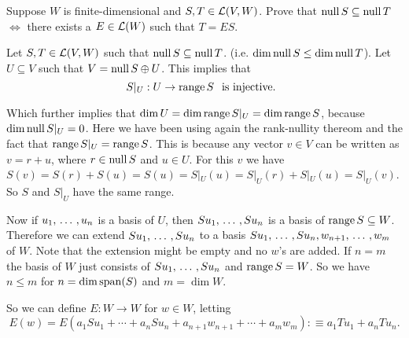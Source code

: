 %
%
%
%


\begin{xrcs}
  Suppose $W$ is finite-dimensional and $S, T \in \mathcal{L} (V,W)$. Prove that $\operatorname{null} S \subseteq \operatorname{null} T$ $\iff$ there exists a $E \in \mathcal{L} (W)$ such that $T=ES$.

  \begin{prf}
    \Rightarrowdirection Let $S, T \in \mathcal{L} (V,W)$ such that $\operatorname{null} S \subseteq \operatorname{null} T$. (i.e. $\dim \operatorname{null} S \leq \dim \operatorname{null} T$). Let $U \subseteq V$ such that $V = \operatorname{null} S \oplus U$. This implies that
    \begin{equation}
      S|_U : U \to \operatorname{range} S \;\;\, \text{is injective.}\;\;
    \end{equation}

   Which further implies that $\dim U = \dim \operatorname{range} S|_U = \dim \operatorname{range} S$, because $\dim \operatorname{null} S|_U =0$. Here we have been using again the rank-nullity thereom and the fact that $\operatorname{range} S|_U = \operatorname{range} S$. This is because any vector $v \in V$ can be written as $v = r + u$, where $r \in \operatorname{null} S$ and $u \in U$. For this $v$ we have  $S(v) = S(r) + S(u) = S(u) = S|_U(u) = S|_U(r) + S|_U(u)= S|_U(v)$. So $S$ and $S|_U$ have the same range.

   Now if $u_1, {\, \ldots \,\,}, u_n$ is a basis of $U$, then $S u_1, {\, \ldots \,\,}, S u_n$ is a basis of $\operatorname{range} S \subseteq W$. Therefore we can extend $S u_1, {\, \ldots \,\,}, S u_n$ to a basis $S u_1, {\, \ldots \,\,}, S u_n, w_{n+1}, {\, \ldots \,\,}, w_{m}$ of $W$. Note that the extension might be empty and no $w$'s are added. If $n = m$ the basis of $W$ just consists of $S u_1, {\, \ldots \,\,}, S u_n$ and $\operatorname{range} S = W$. So we have $n \leq m$ for $n = \dim \operatorname{span} (S)$ and $m = \dim W$.

   So we can define $E: W \to W$ for $w \in W$, letting
   \begin{equation}
     E(w) = E(a_1 Su_1 + \cdots + a_n Su_n + a_{n+1} w_{n+1} + \cdots + a_m w_m) :\equiv a_1 T u _1 + a_n T u_n.
   \end{equation}


\end{prf}
\end{xrcs}
